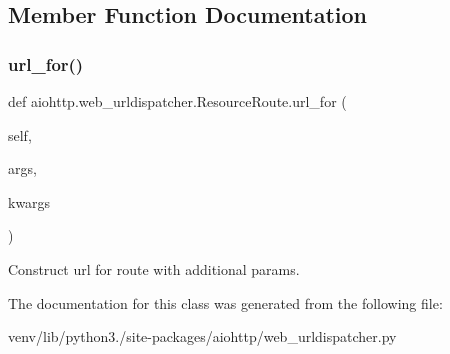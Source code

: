 \subsection{Member Function Documentation}
\mbox{\label{classaiohttp_1_1web__urldispatcher_1_1_resource_route_abca6ca26e2742f4c93c13cefd64d3453}} 
\subsubsection{\texorpdfstring{url\+\_\+for()}{url\_for()}}
{\footnotesize\ttfamily def aiohttp.\+web\+\_\+urldispatcher.\+Resource\+Route.\+url\+\_\+for (\begin{DoxyParamCaption}\item[{}]{self,  }\item[{}]{args,  }\item[{}]{kwargs }\end{DoxyParamCaption})}

\begin{DoxyVerb}Construct url for route with additional params.\end{DoxyVerb}
 

The documentation for this class was generated from the following file\+:\begin{DoxyCompactItemize}
\item 
venv/lib/python3./site-\/packages/aiohttp/web\+\_\+urldispatcher.\+py\end{DoxyCompactItemize}
